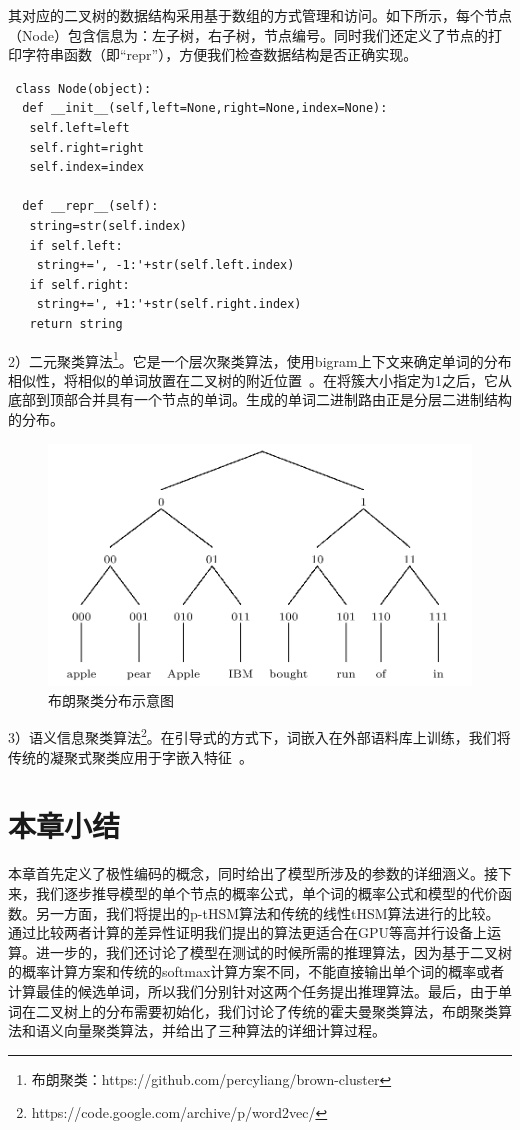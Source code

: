 其对应的二叉树的数据结构采用基于数组的方式管理和访问。如下所示，每个节点（Node）包含信息为：左子树，右子树，节点编号。同时我们还定义了节点的打印字符串函数（即``repr''），方便我们检查数据结构是否正确实现。
\begin{verbatim}
 class Node(object):
  def __init__(self,left=None,right=None,index=None):
   self.left=left
   self.right=right
   self.index=index

  def __repr__(self):
   string=str(self.index)
   if self.left:
    string+=', -1:'+str(self.left.index)
   if self.right:
    string+=', +1:'+str(self.right.index)
   return string
\end{verbatim}


2）二元聚类算法\footnote{布朗聚类：https://github.com/percyliang/brown-cluster}。它是一个层次聚类算法，使用bigram上下文来确定单词的分布相似性，将相似的单词放置在二叉树的附近位置~。在将簇大小指定为1之后，它从底部到顶部合并具有一个节点的单词。生成的单词二进制路由正是分层二进制结构的分布。
\begin{figure}[!ht]
  \centering
\includegraphics[width=0.6\linewidth]{./figures/brown.png}
\caption{布朗聚类分布示意图}\label{fig:brown}
\end{figure}

3）语义信息聚类算法\footnote{https://code.google.com/archive/p/word2vec/}。在引导式的方式下，词嵌入在外部语料库上训练，我们将传统的凝聚式聚类应用于字嵌入特征~。


\section{本章小结}
本章首先定义了极性编码的概念，同时给出了模型所涉及的参数的详细涵义。接下来，我们逐步推导模型的单个节点的概率公式，单个词的概率公式和模型的代价函数。另一方面，我们将提出的p-tHSM算法和传统的线性tHSM算法进行的比较。通过比较两者计算的差异性证明我们提出的算法更适合在GPU等高并行设备上运算。进一步的，我们还讨论了模型在测试的时候所需的推理算法，因为基于二叉树的概率计算方案和传统的softmax计算方案不同，不能直接输出单个词的概率或者计算最佳的候选单词，所以我们分别针对这两个任务提出推理算法。最后，由于单词在二叉树上的分布需要初始化，我们讨论了传统的霍夫曼聚类算法，布朗聚类算法和语义向量聚类算法，并给出了三种算法的详细计算过程。

